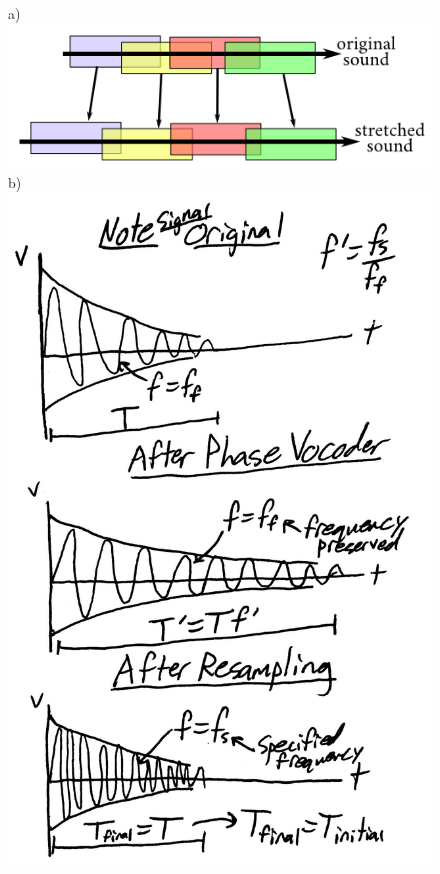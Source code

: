 \documentclass{article}
\begin{document}
    \begin{figure}[H]
        \centering
        a)\includegraphics[scale=0.6]{stretchsound.png}
        b)\includegraphics[scale = 0.12]{SongShifterMethod.jpg}

\end{figure}
\end{document}
